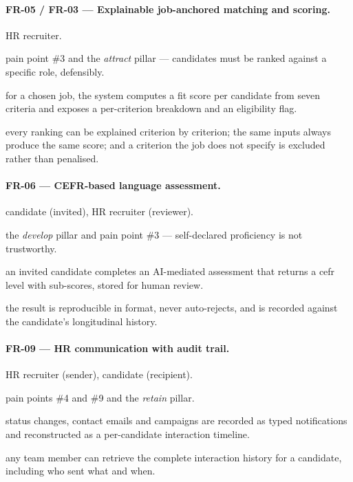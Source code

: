\paragraph{FR-05 / FR-03 --- Explainable job-anchored matching and scoring.}
\begin{description}[noitemsep]
	\item[Actor:] HR recruiter.
	\item[Rationale:] pain point \#3 and the \emph{attract} pillar --- candidates must be ranked against a specific role, defensibly.
	\item[Behaviour:] for a chosen job, the system computes a fit score per candidate from seven criteria and exposes a per-criterion breakdown and an eligibility flag.
	\item[Acceptance:] every ranking can be explained criterion by criterion; the same inputs always produce the same score; and a criterion the job does not specify is excluded rather than penalised.
\end{description}

\paragraph{FR-06 --- CEFR-based language assessment.}
\begin{description}[noitemsep]
	\item[Actor:] candidate (invited), HR recruiter (reviewer).
	\item[Rationale:] the \emph{develop} pillar and pain point \#3 --- self-declared proficiency is not trustworthy.
	\item[Behaviour:] an invited candidate completes an AI-mediated assessment that returns a \gls{cefr} level with sub-scores, stored for human review.
	\item[Acceptance:] the result is reproducible in format, never auto-rejects, and is recorded against the candidate's longitudinal history.
\end{description}

\paragraph{FR-09 --- HR communication with audit trail.}
\begin{description}[noitemsep]
	\item[Actor:] HR recruiter (sender), candidate (recipient).
	\item[Rationale:] pain points \#4 and \#9 and the \emph{retain} pillar.
	\item[Behaviour:] status changes, contact emails and campaigns are recorded as typed notifications and reconstructed as a per-candidate interaction timeline.
	\item[Acceptance:] any team member can retrieve the complete interaction history for a candidate, including who sent what and when.
\end{description}

